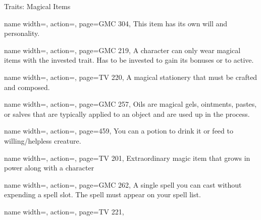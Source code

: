 \begin{PageBack}
\begin{Tables}{\backTableHeight}
\begin{Table}{Traits: Magical Items}
\begin{entry}{}{%
                name width=\conditionLength,%
                action=\Intelligent,
                page=GMC 304,
            }
                This item has its own will and personality.
            \end{entry}
            \begin{entry}{}{%
                name width=\conditionLength,%
                action=\Invested,
                page=GMC 219,
            }
                A character can only wear  magical items with the invested trait.
                Has to be invested to gain its bonuses or to active.
            \end{entry}
            \begin{entry}{}{%
                name width=\conditionLength,%
                action=\Missive,
                page=TV 220,
            }
                A magical stationery that must be crafted and composed.
            \end{entry}
            \begin{entry}{}{%
                name width=\conditionLength,%
                action=\Oil,
                page=GMC 257,
            }
                Oils are magical gels, ointments, pastes, or salves that are typically applied to an object and are used up in the process.
            \end{entry}
            \begin{entry}{}{%
                name width=\conditionLength,%
                action=\Potion,
                page=459,
            }
                You can  a potion to drink it or feed to willing/helpless creature.\hfill
            \end{entry}
            \begin{entry}{}{%
                name width=\conditionLength,%
                action=\Relic,
                page=TV 201,
            }
                Extraordinary magic item that grows in power along with a character
            \end{entry}
            \begin{entry}{}{%
                name width=\conditionLength,%
                action=\Scroll,
                page=GMC 262,
            }
                A single spell you can cast without expending a spell slot.
                The spell must appear on your spell list.\hfill
            \end{entry}
            \begin{entry}{}{%
                name width=\conditionLength,%
                action=\Spellgun,
                page=TV 221,
            }

\end{entry}
\end{Table}
\end{Tables}
\end{PageBack}
